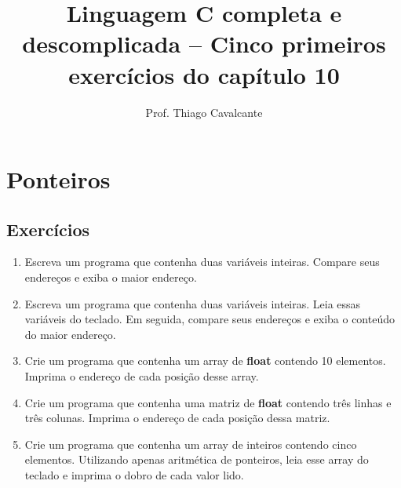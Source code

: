 \documentclass[a4paper,12pt]{article}
\title{Linguagem C completa e descomplicada -- Cinco primeiros exercícios do capítulo 10}
\author{Prof. Thiago Cavalcante}
\date{}
\begin{document}
\maketitle

\setcounter{section}{9}
\section{Ponteiros}

\setcounter{subsection}{6}
\subsection{Exercícios}

\begin{enumerate}
  \item Escreva um programa que contenha duas variáveis inteiras. Compare seus endereços e exiba o maior endereço.
  \item Escreva um programa que contenha duas variáveis inteiras. Leia essas variáveis do teclado. Em seguida, compare seus endereços e exiba o conteúdo do maior endereço.
  \item Crie um programa que contenha um array de \textbf{float} contendo 10 elementos. Imprima o endereço de cada posição desse array.
  \item Crie um programa que contenha uma matriz de \textbf{float} contendo três linhas e três colunas. Imprima o endereço de cada posição dessa matriz.
  \item Crie um programa que contenha um array de inteiros contendo cinco elementos. Utilizando apenas aritmética de ponteiros, leia esse array do teclado e imprima o dobro de cada valor lido.
\end{enumerate}
\end{document}
